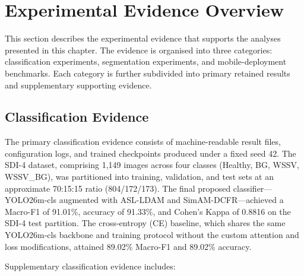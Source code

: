 
\section{Experimental Evidence Overview}
\label{sec:evidence-overview}

This section describes the experimental evidence that supports the analyses presented in this chapter. The evidence is organised into three categories: classification experiments, segmentation experiments, and mobile-deployment benchmarks. Each category is further subdivided into primary retained results and supplementary supporting evidence.

\subsection{Classification Evidence}
\label{sec:evidence-classification}

The primary classification evidence consists of machine-readable result files, configuration logs, and trained checkpoints produced under a fixed seed 42. The SDI-4 dataset, comprising 1,149 images across four classes (Healthy, BG, WSSV, WSSV\_BG), was partitioned into training, validation, and test sets at an approximate 70:15:15 ratio (804/172/173). The final proposed classifier---YOLO26m-cls augmented with ASL-LDAM and SimAM-DCFR---achieved a Macro-F1 of 91.01\%, accuracy of 91.33\%, and Cohen's Kappa of 0.8816 on the SDI-4 test partition. The cross-entropy (CE) baseline, which shares the same YOLO26m-cls backbone and training protocol without the custom attention and loss modifications, attained 89.02\% Macro-F1 and 89.02\% accuracy.

Supplementary classification evidence includes:

